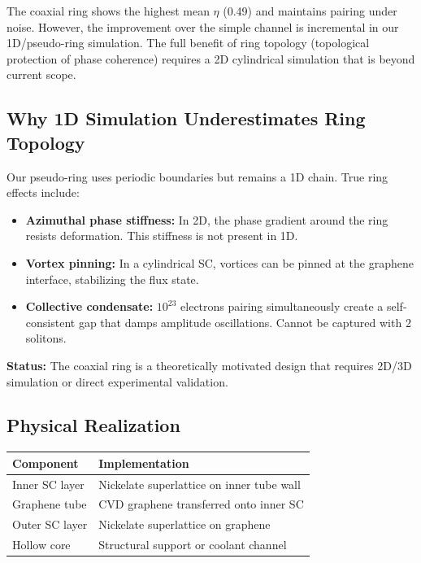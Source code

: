 \documentclass[11pt, a4paper]{article}
\begin{document}
The coaxial ring shows the highest mean $\eta$ (0.49) and maintains
pairing under noise. However, the improvement over the simple
channel is incremental in our 1D/pseudo-ring simulation. The full
benefit of ring topology (topological protection of phase coherence)
requires a 2D cylindrical simulation that is beyond current scope.

\subsection{Why 1D Simulation Underestimates Ring Topology}

Our pseudo-ring uses periodic boundaries but remains a 1D chain.
True ring effects include:

\begin{itemize}[nosep]
  \item \textbf{Azimuthal phase stiffness:} In 2D, the phase gradient
        around the ring resists deformation. This stiffness is not
        present in 1D.
  \item \textbf{Vortex pinning:} In a cylindrical SC, vortices can
        be pinned at the graphene interface, stabilizing the flux state.
  \item \textbf{Collective condensate:} $10^{23}$ electrons pairing
        simultaneously create a self-consistent gap that damps
        amplitude oscillations. Cannot be captured with 2 solitons.
\end{itemize}

\textcolor{nm-red}{\textbf{Status:}} The coaxial ring is a
theoretically motivated design that requires 2D/3D simulation or
direct experimental validation.

\subsection{Physical Realization}

\begin{center}
\begin{tabular}{@{}ll@{}}
\toprule
\textbf{Component} & \textbf{Implementation} \\
\midrule
Inner SC layer & Nickelate superlattice on inner tube wall \\
Graphene tube & CVD graphene transferred onto inner SC \\
Outer SC layer & Nickelate superlattice on graphene \\
Hollow core & Structural support or coolant channel \\
\bottomrule
\end{tabular}
\end{center}
\end{document}
